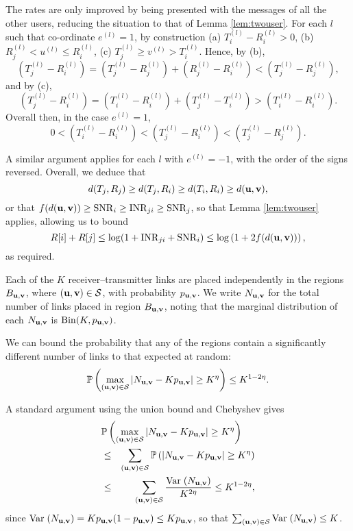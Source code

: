 \documentclass[journal]{IEEEtran}
\begin{document}
\begin{IEEEproof} The rates are only improved by being presented with the 
messages of all the other users, reducing the situation to that of 
Lemma \ref{lem:twouser}. For each $l$ such that
co-ordinate $e^{(l)} = 1$, by construction
(a) $T_i^{(l)} - R_i^{(l)} > 0$, (b) $R_j^{(l)} < u^{(l)} \leq R_i^{(l)}$,
(c) $T_j^{(l)} \geq v^{(l)} > T_i^{(l)}$.
Hence, by (b),
$$(T_j^{(l)} - R_i^{(l)}) = (T_j^{(l)} - R_j^{(l)}) 
+ (R_j^{(l)} - R_i^{(l)}) < (T_j^{(l)} - R_j^{(l)}),$$
and by (c),
$$(T_j^{(l)} - R_i^{(l)}) = (T_i^{(l)} - R_i^{(l)}) 
+ (T_j^{(l)} - T_i^{(l)}) > (T_i^{(l)} - R_i^{(l)}).$$
Overall then, in the case $e^{(l)} = 1$,
$$ 0 < (T_i^{(l)} - R_i^{(l)}) < (T_j^{(l)} - R_i^{(l)}) < (T_j^{(l)} - R_j^{(l)}).$$

A similar argument applies for
each $l$ with $e^{(l)} = -1$, with the order of the signs reversed.
Overall, we deduce that 
$$d(T_j,R_j) \geq d(T_j, R_i) \geq d(T_i, R_i) \geq
d({\mathbf{ u}},{\mathbf{ v}}),$$ or that
$f(d({\mathbf{ u}},{\mathbf{ v}})) \geq {\rm{SNR}}_i \geq {\rm{INR}}_{ji} \geq {\rm{SNR}}_j$, so that
Lemma \ref{lem:twouser} applies, allowing us to bound
$$ R[i] + R[j] \leq \log(1 + {\rm{INR}}_{ji} + {\rm{SNR}}_i) \leq \log
\left(1 + 2f(d({\mathbf{ u}},{\mathbf{ v}}) ) \right),$$
%
as required.
\end{IEEEproof}

 Each of the $K$ receiver--transmitter links are placed independently
in the regions $B_{{\mathbf{ u}},{\mathbf{ v}}}$, where $({\mathbf{ u}},{\mathbf{ v}}) \in {\mathcal{S}}$,
 with probability $p_{{\mathbf{ u}},{\mathbf{ v}}}$.
We write $N_{{\mathbf{ u}},{\mathbf{ v}}}$ for the total number of links
placed in region $B_{{\mathbf{ u}},{\mathbf{ v}}}$, noting that the marginal distribution of each 
$N_{{\mathbf{ u}},{\mathbf{ v}}}$ is ${\rm{Bin}}(K, p_{{\mathbf{ u}},{\mathbf{ v}}})$.

\begin{lemma} \label{lem:full}
We can bound the probability that any of the regions contain a significantly different
number of links to that expected at random:
$$ {\mathbb {P}} \left( \max_{({\mathbf{ u}},{\mathbf{ v}}) \in {\mathcal{S}}} \left| N_{{\mathbf{ u}},{\mathbf{ v}}} - 
K p_{{\mathbf{ u}},{\mathbf{ v}}} \right| \geq 
K^{\eta} \right) \leq K^{1-2\eta}.
$$
\end{lemma}
\begin{IEEEproof} A standard argument using 
the union bound and Chebyshev gives
\begin{eqnarray*}
\lefteqn{\pr \left( \max_{(\idc{u}{v}) \in \SSC} \left| N_{\idc{u}{v}} - 
K \pB{u}{v} \right| \geq 
K^{\eta} \right) } \\
& \leq & \sum_{ (\idc{u}{v})  \in \SSC} \pr \left( \left| N_{\idc{u}{v}}  
- K \pB{u}{v}  \right| \geq K^{\eta} \right) \\
& \leq & \sum_{ (\idc{u}{v})  \in \SSC} \frac{\var(N_{\idc{u}{v}})}
{K^{2 \eta}} \leq  K^{1-2 \eta},
\end{eqnarray*}
 since ${\rm{Var\;}}( N_{{\mathbf{ u}},{\mathbf{ v}}} ) = K p_{{\mathbf{ u}},{\mathbf{ v}}}  (1- p_{{\mathbf{ u}},{\mathbf{ v}}} ) 
\leq K p_{{\mathbf{ u}},{\mathbf{ v}}} $,
so that  
$\sum_{ ({\mathbf{ u}},{\mathbf{ v}})  \in {\mathcal{S}}} {\rm{Var\;}}( N_{{\mathbf{ u}},{\mathbf{ v}}} ) \leq K$.
\end{IEEEproof}
%
\end{document}

